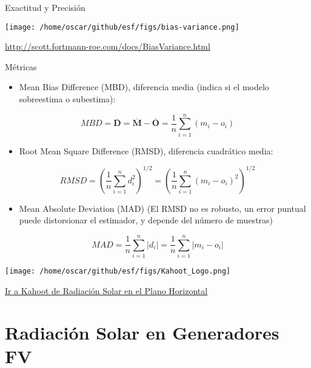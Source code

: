 \documentclass[xcolor={usenames,svgnames,dvipsnames}]{beamer}
\begin{document}
\begin{frame}[label={sec:org2f1dbc7}]{Exactitud y Precisión}
\begin{center}
\texttt{[image: /home/oscar/github/esf/figs/bias-variance.png]}
\end{center}

\url{http://scott.fortmann-roe.com/docs/BiasVariance.html}
\end{frame}

\begin{frame}[label={sec:orgcbb1f9b}]{Métricas}
\begin{itemize}
\item \alert{Mean Bias Difference (MBD)}, diferencia media (indica si el modelo sobreestima o subestima):
\end{itemize}
\[
MBD = \overline{\mathbf{D}} = \overline{\mathbf{M}} - \overline{\mathbf{O}} = \frac{1}{n} \sum_{i=1}^n (m_i - o_i)
\]

\begin{itemize}
\item \alert{Root Mean Square Difference (RMSD)}, diferencia cuadrático media:
\end{itemize}
\[
RMSD = \left(\frac{1}{n} \sum_{i=1}^n d_i^2 \right)^{1/2} =  \left( \frac{1}{n} \sum_{i=1}^n (m_i - o_i)^2  \right)^{1/2}
\]

\begin{itemize}
\item \alert{Mean Absolute Deviation (MAD)} (El RMSD no es robusto, un error puntual puede distorsionar el estimador, y depende del número de muestras)
\end{itemize}

\[
MAD = \frac{1}{n} \sum_{i=1}^n \left|d_i\right| =  \frac{1}{n} \sum_{i=1}^n \left|m_i - o_i\right|
\]
\end{frame}
\begin{frame}[label={sec:org4a304f6}]{}
\begin{center}
\texttt{[image: /home/oscar/github/esf/figs/Kahoot\_Logo.png]}
\end{center}

\href{https://play.kahoot.it/v2/?quizId=62ee25e6-4056-4321-b95c-7af71b3fb069}{Ir a Kahoot de Radiación Solar en el Plano Horizontal}
\end{frame}

\section{Radiación Solar en Generadores FV}
\label{sec:org8f86fb1}
\end{document}
